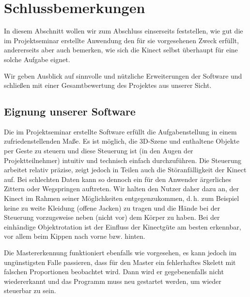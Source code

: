 \section{Schlussbemerkungen}
In diesem Abschnitt wollen wir zum Abschluss einserseits feststellen, wie gut die im Projektseminar erstellte Anwendung den für sie vorgesehenen Zweck erfüllt, andererseits aber auch bemerken, wie sich die Kinect selbst überhaupt für eine solche Aufgabe eignet.\par 
Wir geben Ausblick auf sinnvolle und nützliche Erweiterungen der Software und schließen mit einer Gesamtbewertung des Projektes aus unserer Sicht.
%
%
\subsection{Eignung unserer Software}
Die im Projektseminar erstellte Software erfüllt die Aufgabenstellung in einem zufriedenstellenden Maße. Es ist möglich, die 3D-Szene und enthaltene Objekte per Geste zu steuern und diese Steuerung ist (in den Augen der Projektteilnehmer) intuitiv und technisch einfach durchzuführen. Die Steuerung arbeitet relativ präzise, zeigt jedoch in Teilen auch die Störanfälligkeit der Kinect auf. Bei schlechten Daten kann so dennoch ein für den Anwender ärgerliches Zittern oder Wegspringen auftreten. Wir halten den Nutzer daher dazu an, der Kinect im Rahmen seiner Möglichkeiten entgegenzukommen, d.\,h. zum Beispiel keine zu weite Kleidung (offene Jacken) zu tragen und die Hände bei der Steuerung vorzugsweise neben (nicht vor) dem Körper zu haben. Bei der einhändige Objektrotation ist der Einfluss der Kinectgüte am besten erkennbar, vor allem beim Kippen nach vorne bzw. hinten.\par 
Die Mastererkennung funktioniert ebenfalls wie vorgesehen, es kann jedoch im ungünstigsten Falle passieren, dass für den Master ein fehlerhaftes Skelett mit falschen Proportionen beobachtet wird. Dann wird er gegebenenfalls nicht wiedererkannt und das Programm muss neu gestartet werden, um wieder steuerbar zu sein.
%
